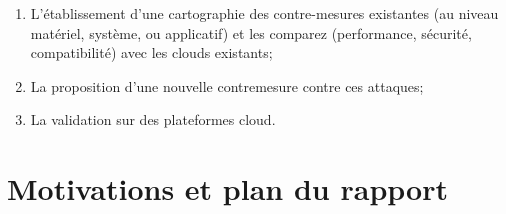 \begin{enumerate}
\item L'établissement d'une cartographie des contre-mesures existantes (au niveau matériel, système, ou applicatif) et les comparez (performance, sécurité, compatibilité) avec les clouds existants;
\item La proposition d'une nouvelle contremesure contre ces attaques;
\item La validation sur des plateformes cloud.

\end{enumerate}  

\section{Motivations et plan du rapport}
\label{sec:plan} 

